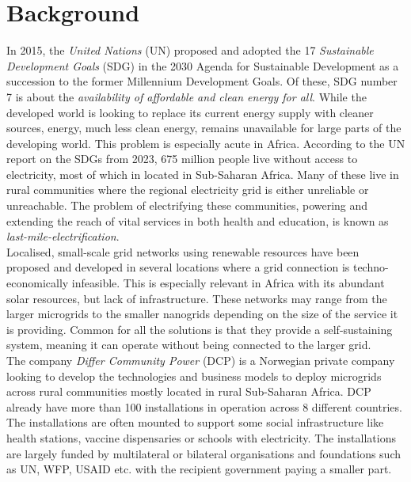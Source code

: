 \section{Background}

In 2015, the \textit{United Nations} (UN) proposed and adopted the 17 \textit{Sustainable Development Goals} (SDG) in the 2030 Agenda for Sustainable Development\cite{2030agenda} as a succession to the former Millennium Development Goals. Of these, SDG number 7 is about the \textit{availability of affordable and clean energy for all}\cite{un_sdg_7}. While the developed world is looking to replace its current energy supply with cleaner sources, energy, much less clean energy, remains unavailable for large parts of the developing world. This problem is especially acute in Africa. According to the UN report on the SDGs from 2023, 675 million people live without access to electricity, most of which in located in Sub-Saharan Africa.\cite{Desa2023-mr} Many of these live  in rural communities where the regional electricity grid is either unreliable or unreachable. The problem of electrifying these communities, powering and extending the reach of vital services in both health and education, is known as \textit{last-mile-electrification}.\\

Localised, small-scale grid networks using renewable resources have been proposed and developed in several locations where a grid connection is techno-economically infeasible. This is especially relevant in Africa with its abundant solar resources, but lack of infrastructure.\cite{Wang2021-kb} These networks may range from the larger microgrids to the smaller nanogrids depending on the size of the service it is providing. Common for all the solutions is that they provide a self-sustaining system, meaning it can operate without being connected to the larger grid.\\

The company \textit{Differ Community Power} (DCP) is a Norwegian private company looking to develop the technologies and business models to deploy microgrids across rural communities mostly located in rural Sub-Saharan Africa. DCP already have more than 100 installations in operation across 8 different countries. The installations are often mounted to support some social infrastructure like health stations, vaccine dispensaries or schools with electricity. The installations are largely funded by multilateral or bilateral organisations and foundations such as UN, WFP, USAID etc. with the recipient government paying a smaller part.\\

